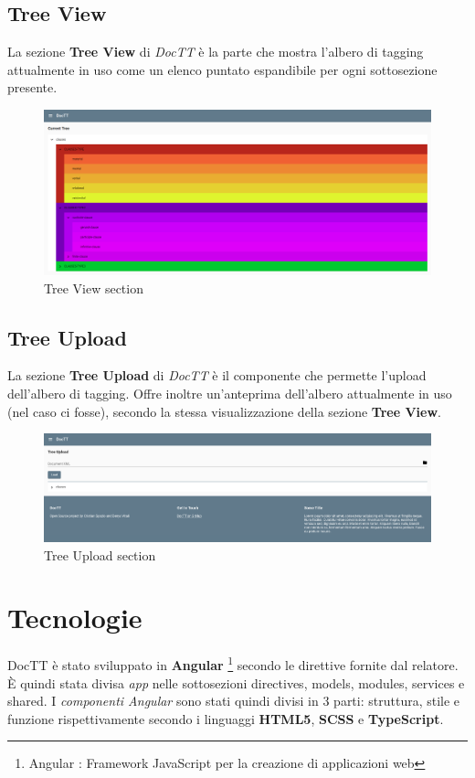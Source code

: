 \documentclass[twoside]{supsistudent}
\begin{document}
\subsection{Tree View}
La sezione \textbf{Tree View} di \textit{DocTT} è la parte che mostra l'albero
di tagging attualmente in uso come un elenco puntato espandibile per ogni
sottosezione presente.

\begin{figure}[h!]
  \includegraphics[width=\linewidth]{figures/treeView.png}
  \caption{Tree View section}
  \label{fig:treeView}
\end{figure}

\pagebreak

\subsection{Tree Upload}
La sezione \textbf{Tree Upload} di \textit{DocTT} è il componente che permette
l'upload dell'albero di tagging. Offre inoltre un'anteprima dell'albero 
attualmente in uso (nel caso ci fosse), secondo la stessa visualizzazione 
della sezione \textbf{Tree View}.
 
\begin{figure}[h!]
  \includegraphics[width=\linewidth]{figures/treeUpload.png}
  \caption{Tree Upload section}
  \label{fig:treeUpload}
\end{figure}

\section{Tecnologie}
DocTT è stato sviluppato in \textbf{Angular}
\footnote{Angular : Framework JavaScript per la creazione di applicazioni web}
secondo le direttive fornite dal relatore. È quindi stata divisa \textit{app}
nelle sottosezioni directives, models, modules, services e shared. I 
\textit{componenti Angular} sono stati quindi divisi in 3 parti: struttura, 
stile e funzione rispettivamente secondo i linguaggi \textbf{HTML5}, 
\textbf{SCSS} e \textbf{TypeScript}.
\end{document}
